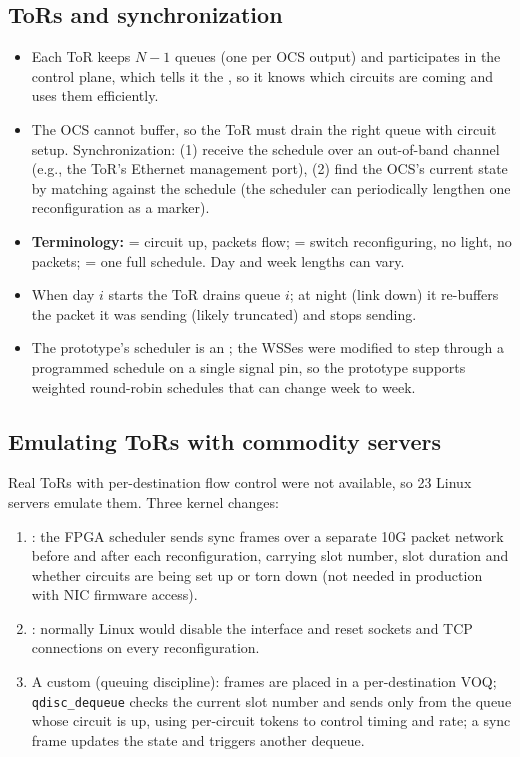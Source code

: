 \subsection{ToRs and synchronization}
\begin{itemize}
\item Each ToR keeps $N-1$ queues (one per OCS output) and participates in the control plane, which tells it the , so it knows which circuits are coming and uses them efficiently.
\item The OCS cannot buffer, so the ToR must drain the right queue  with circuit setup. Synchronization: (1) receive the schedule over an out-of-band channel (e.g., the ToR's Ethernet management port), (2) find the OCS's current state by matching  against the schedule (the scheduler can periodically lengthen one reconfiguration as a marker).
\item \textbf{Terminology:}  = circuit up, packets flow;  = switch reconfiguring, no light, no packets;  = one full schedule. Day and week lengths can vary.
\item When day $i$ starts the ToR drains queue $i$; at night (link down) it re-buffers the packet it was sending (likely truncated) and stops sending.
\item The prototype's scheduler is an ; the WSSes were modified to step through a programmed schedule on a single signal pin, so the prototype supports weighted round-robin schedules that can change week to week.
\end{itemize}

\subsection{Emulating ToRs with commodity servers}
Real ToRs with per-destination flow control were not available, so 23 Linux servers emulate them. Three kernel changes:
\begin{enumerate}
\item {}: the FPGA scheduler sends sync frames over a separate 10G packet network before and after each reconfiguration, carrying slot number, slot duration and whether circuits are being set up or torn down (not needed in production with NIC firmware access).
\item {}: normally Linux would disable the interface and reset sockets and TCP connections on every reconfiguration.
\item A custom  (queuing discipline): frames are placed in a per-destination VOQ; \texttt{qdisc\_dequeue} checks the current slot number and sends only from the queue whose circuit is up, using per-circuit tokens to control timing and rate; a sync frame updates the state and triggers another dequeue.
\end{enumerate}

